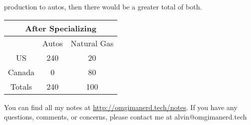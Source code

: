 \documentclass{article}
\begin{document}
production to autos, then there would be a greater total of both.
\begin{center}
  \begin{tabular}{|c|c|c|}
    \hline
    \multicolumn{3}{|c|}{After Specializing} \\ \hline
           & Autos & Natural Gas  \\ \hline
    US     & 240 & 20             \\ \hline
    Canada & 0   & 80             \\ \hline
    Totals & 240 & 100            \\ \hline
  \end{tabular}
\end{center}

\begin{center}
  You can find all my notes at \url{http://omgimanerd.tech/notes}. If you have
  any questions, comments, or concerns, please contact me at
  alvin@omgimanerd.tech
\end{center}
\end{document}
